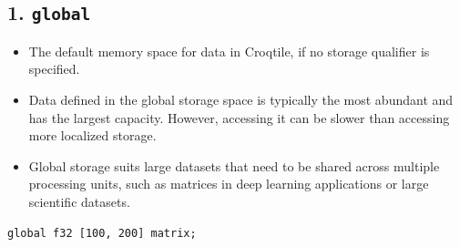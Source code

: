 \subsection*{1. \texttt{global}}

\begin{itemize}[leftmargin=1.6em]
\item The default memory space for data in Croqtile, if no storage qualifier is specified.
\item Data defined in the global storage space is typically the most abundant and has the largest capacity. However, accessing it can be slower than accessing more localized storage.
\item Global storage suits large datasets that need to be shared across multiple processing units, such as matrices in deep learning applications or large scientific datasets.
\end{itemize}

\begin{lstlisting}[language=croqtile,caption={1. global}]
global f32 [100, 200] matrix;
\end{lstlisting}

